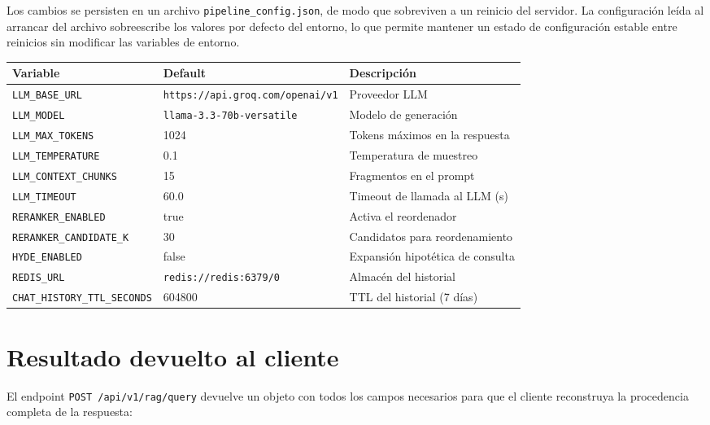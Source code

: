 \documentclass[11pt]{article}
\begin{document}
Los cambios se persisten en un archivo \texttt{pipeline\_config.json}, de modo que sobreviven
a un reinicio del servidor. La configuración leída al arrancar del archivo sobreescribe los
valores por defecto del entorno, lo que permite mantener un estado de configuración estable
entre reinicios sin modificar las variables de entorno.

\begin{center}
\begin{tabular}{lll}
\toprule
\textbf{Variable} & \textbf{Default} & \textbf{Descripción} \\
\midrule
\texttt{LLM\_BASE\_URL} & \texttt{https://api.groq.com/openai/v1} & Proveedor LLM \\
\texttt{LLM\_MODEL} & \texttt{llama-3.3-70b-versatile} & Modelo de generación \\
\texttt{LLM\_MAX\_TOKENS} & 1024 & Tokens máximos en la respuesta \\
\texttt{LLM\_TEMPERATURE} & 0.1 & Temperatura de muestreo \\
\texttt{LLM\_CONTEXT\_CHUNKS} & 15 & Fragmentos en el prompt \\
\texttt{LLM\_TIMEOUT} & 60.0 & Timeout de llamada al LLM (s) \\
\texttt{RERANKER\_ENABLED} & true & Activa el reordenador \\
\texttt{RERANKER\_CANDIDATE\_K} & 30 & Candidatos para reordenamiento \\
\texttt{HYDE\_ENABLED} & false & Expansión hipotética de consulta \\
\texttt{REDIS\_URL} & \texttt{redis://redis:6379/0} & Almacén del historial \\
\texttt{CHAT\_HISTORY\_TTL\_SECONDS} & 604800 & TTL del historial (7 días) \\
\bottomrule
\end{tabular}
\end{center}

\section{Resultado devuelto al cliente}

El endpoint \texttt{POST /api/v1/rag/query} devuelve un objeto con todos los campos
necesarios para que el cliente reconstruya la procedencia completa de la respuesta:
\end{document}
